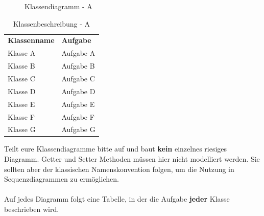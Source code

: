 \begin{figure}[h]
	\centering
	\caption{Klassendiagramm - A}
	\label{fig:klassendiagramm-a}
\end{figure}

\begin{table}[h]
	\centering
	\begin{tabularx}{\textwidth}{X X}
		\rowcolor[HTML]{C0C0C0} 
		\textbf{Klassenname} & \textbf{Aufgabe} \\
		Klasse A & Aufgabe A \\
		\rowcolor[HTML]{E7E7E7} 
		Klasse B & Aufgabe B \\
		Klasse C & Aufgabe C \\
		\rowcolor[HTML]{E7E7E7} 
		Klasse D & Aufgabe D \\
		Klasse E & Aufgabe E \\
		\rowcolor[HTML]{E7E7E7} 
		Klasse F & Aufgabe F \\
		Klasse G & Aufgabe G
	\end{tabularx}
	\caption{Klassenbeschreibung - A}
	\label{table:klassenbeschreibung-a}
\end{table}

\begin{tcolorbox}
Teilt eure Klassendiagramme bitte auf und baut \textbf{kein} einzelnes riesiges Diagramm.
Getter und Setter Methoden müssen hier nicht modelliert werden.
Sie sollten aber der klassischen Namenskonvention folgen, um die Nutzung in Sequenzdiagrammen zu ermöglichen.
\\\\
Auf jedes Diagramm folgt eine Tabelle, in der die Aufgabe \textbf{jeder} Klasse beschrieben wird.
\end{tcolorbox}


